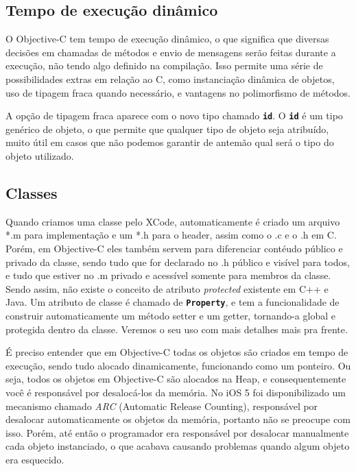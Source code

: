 \documentclass[a4paper,12pt,brazil,doubleside]{book}
\begin{document}
\begin{singlespace}
\bigskip

\subsection{Tempo de execução dinâmico}


O Objective-C tem tempo de execução dinâmico, o que significa que diversas decisões em chamadas de métodos e envio de mensagens serão feitas durante a execução, não tendo algo definido na compilação. Isso permite uma série de possibilidades extras em relação ao C, como instanciação dinâmica de objetos, uso de tipagem fraca quando necessário, e vantagens no polimorfismo de métodos.

A opção de tipagem fraca aparece com o novo tipo chamado \texttt{\textbf{id}}. O \texttt{\textbf{id}} é um tipo genérico de objeto, o que permite que qualquer tipo de objeto seja atribuído, muito útil em casos que não podemos garantir de antemão qual será o tipo do objeto utilizado.




\subsection{Classes}


Quando criamos uma classe pelo XCode, automaticamente é criado um arquivo *.m para implementação e um *.h para o header, assim como o .c e o .h em C. Porém, em Objective-C eles também servem para diferenciar contéudo público e privado da classe, sendo tudo que for declarado no .h público e visível para todos, e tudo que estiver no .m privado e acessível somente para membros da classe. Sendo assim, não existe o conceito de atributo \emph{protected} existente em C++ e Java. Um atributo de classe é chamado de \texttt{\textbf{Property}}, e tem a funcionalidade de construir automaticamente um método setter e um getter, tornando-a global e protegida dentro da classe. Veremos o seu uso com mais detalhes mais pra frente.


É preciso entender que em Objective-C todas os objetos são criados em tempo de execução, sendo tudo alocado dinamicamente, funcionando como um ponteiro. Ou seja, todos os objetos em Objective-C são alocados na Heap, e consequentemente você é responsável por desalocá-los da memória. No iOS 5 foi disponibilizado um mecanismo chamado \emph{ARC} (Automatic Release Counting), responsável por desalocar automaticamente os objetos da memória, portanto não se preocupe com isso. Porém, até então o programador era responsável por desalocar manualmente cada objeto instanciado, o que acabava causando problemas quando algum objeto era esquecido.


\end{singlespace}
\end{document}
